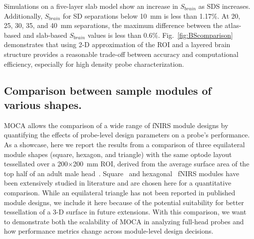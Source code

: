 Simulations on a five-layer slab model show an increase in $S_{brain}$ as SDS increases. Additionally, $S_{brain}$ for SD separations below 10~mm is less than 1.17\%. At 20, 25, 30, 35, and 40~mm separations, the maximum difference between the atlas-based and slab-based $S_{brain}$ values is less than 0.6\%. Fig.~\ref{fig:BScomparison} demonstrates that using 2-D approximation of the ROI and a layered brain structure provides a reasonable trade-off between accuracy and computational efficiency, especially for high density probe characterization.

\subsection{Comparison between sample modules of various shapes.}
\label{subsec:comparison}
MOCA allows the comparison of a wide range of fNIRS module designs by quantifying the effects of probe-level design parameters on a probe's performance. As a showcase, here we report the results from a comparison of three equilateral module shapes (square, hexagon, and triangle) with the same optode layout tessellated over a 200$\times$200~mm ROI, derived from the average surface area of the top half of an adult male head~\cite{McConville1980}. Square~\cite{Chitnis2016, Bci2017, Zimmermann2013} and hexagonal~\cite{Funane2017, Wyser2017, Zhao2019} fNIRS modules have been extensively studied in literature and are chosen here for a quantitative comparison. While an equilateral triangle has not been reported in published module designs, we include it here because of the potential suitability for better tessellation of a 3-D surface in future extensions. With this comparison, we want to demonstrate both the scalability of MOCA in analyzing full-head probes and how performance metrics change across module-level design decisions.

